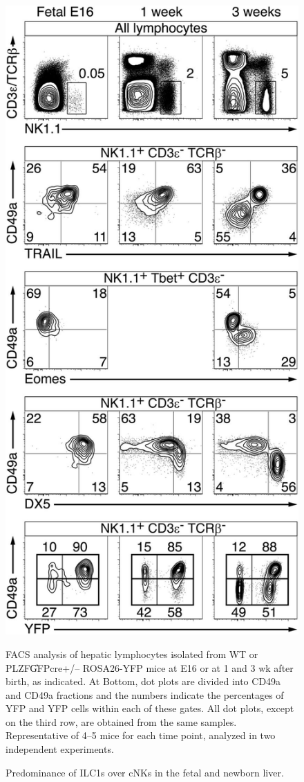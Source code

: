 \begin{figure}[p]
\begin{center}
	\includegraphics[height=0.5\textheight]{figures/chapter2/F3}
\end{center}
	\caption{Predominance of ILC1s over cNKs in the fetal and newborn liver.} 
	 FACS analysis of hepatic lymphocytes isolated from WT or PLZF\U{GFPcre+/--} ROSA26-YFP mice at E16 or at 1 and 3 wk after birth, as indicated. At Bottom, dot plots are divided into CD49a\UP{} and CD49a\UM{} fractions and the numbers indicate the percentages of YFP\UP{} and YFP\UM{} cells within each of these gates. All dot plots, except on the third row, are obtained from the same samples. Representative of 4–5 mice for each time point, analyzed in two independent experiments.
	\label{fig:chap2_F3}
\end{figure}

